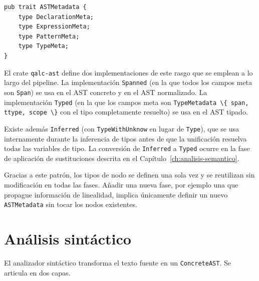 \begin{lstlisting}[language={}, caption=Definición del rasgo ASTMetadata en Rust]
pub trait ASTMetadata {
    type DeclarationMeta;
    type ExpressionMeta;
    type PatternMeta;
    type TypeMeta;
}
\end{lstlisting}

El crate \lstinline|qalc-ast| define dos implementaciones de este rasgo que se emplean a lo largo del pipeline. La implementación \lstinline|Spanned| (en la que todos los campos meta son \lstinline|Span|) se usa en el AST concreto y en el AST normalizado. La implementación \lstinline|Typed| (en la que los campos meta son \lstinline|TypeMetadata \{ span, ttype, scope \}| con el tipo completamente resuelto) se usa en el AST tipado.

Existe además \lstinline|Inferred| (con \lstinline|TypeWithUnknow| en lugar de \lstinline|Type|), que se usa internamente durante la inferencia de tipos antes de que la unificación resuelva todas las variables de tipo. La conversión de \lstinline|Inferred| a \lstinline|Typed| ocurre en la fase de aplicación de sustituciones descrita en el Capítulo~\ref{ch:analisis-semantico}.

Gracias a este patrón, los tipos de nodo se definen una sola vez y se reutilizan sin modificación en todas las fases. Añadir una nueva fase, por ejemplo una que propague información de linealidad, implica únicamente definir un nuevo \lstinline|ASTMetadata| sin tocar los nodos existentes.

\section{Análisis sintáctico}
\label{sec:parser}

El analizador sintáctico transforma el texto fuente en un \lstinline|ConcreteAST|. Se articula en dos capas.

